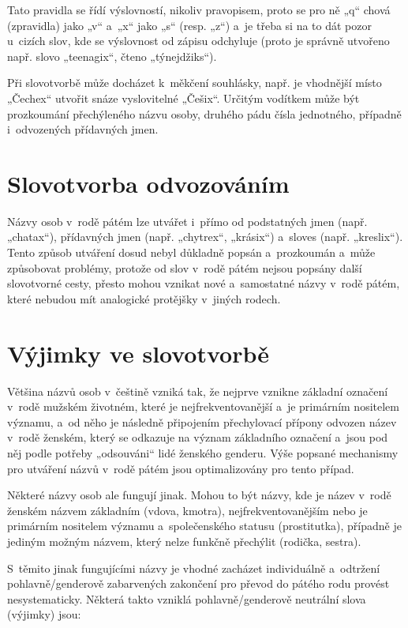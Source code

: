 Tato pravidla se řídí výslovností, nikoliv pravopisem, proto se pro ně
„q“ chová (zpravidla) jako „v“ a „x“ jako „s“ (resp. „z“)
a je třeba si na to dát pozor u cizích slov, kde se výslovnost od zápisu
odchyluje (proto je správně utvořeno např. slovo „teenagix“,
čteno „týnejdžiks“).

Při slovotvorbě může docházet k měkčení souhlásky, např.
je vhodnější místo „Čechex“
utvořit snáze vyslovitelné „Češix“.
Určitým vodítkem může být prozkoumání přechýleného názvu
osoby,
druhého pádu čísla jednotného, případně i odvozených přídavných
jmen.

\section{Slovotvorba odvozováním}

Názvy osob v rodě pátém lze utvářet i přímo od podstatných jmen
(např. „chatax“), přídavných jmen (např. „chytrex“, „krásix“)
a sloves (např. „kreslix“). Tento způsob utváření
dosud nebyl důkladně popsán a prozkoumán a může způsobovat problémy,
protože od slov v rodě pátém nejsou popsány další slovotvorné cesty,
přesto mohou vznikat nové a samostatné názvy v rodě pátém,
které nebudou mít analogické protějšky v jiných rodech.

\section{Výjimky ve slovotvorbě}

Většina názvů osob v češtině vzniká tak, že nejprve vznikne základní
označení v rodě mužském životném, které je nejfrekventovanější a je primárním
nositelem významu, a od něho je následně připojením přechylovací přípony
odvozen název v rodě ženském, který se odkazuje na význam základního označení
a jsou pod něj podle potřeby „odsouváni“ lidé ženského genderu.
Výše popsané mechanismy pro utváření názvů v rodě pátém jsou optimalizovány
pro tento případ.

Některé názvy osob ale fungují jinak. Mohou to být názvy, kde je název
v rodě ženském názvem základním (vdova, kmotra), nejfrekventovanějším
nebo je primárním nositelem významu a společenského statusu
(prostitutka), případně je jediným možným názvem, který nelze funkčně přechýlit
(rodička, sestra).

S těmito jinak fungujícími názvy je vhodné zacházet individuálně a odtržení
pohlavně/genderově zabarvených zakončení pro převod do pátého rodu
provést nesystematicky. Některá takto vzniklá pohlavně/genderově neutrální slova
(výjimky) jsou:

